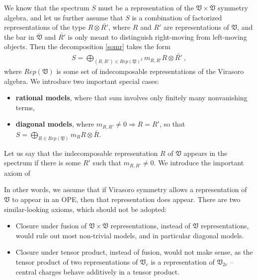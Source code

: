\documentclass[12pt, a4paper, notitlepage, twoside]{report}
\numberwithin{equation}{section}
\theoremstyle{break}
\begin{document}
We know that the spectrum $S$ must be a representation of the 
$\mathfrak{V}\times \overline{\mathfrak{V}}$ symmetry algebra, and let us further assume that $S$ is a combination of factorized representations of the type $R\otimes \bar{R'}$, where $R$ and $R'$ are representations of $\mathfrak{V}$, and the bar in $\overline{\mathfrak{V}}$ and $\bar{R'}$ is only meant to distinguish right-moving from left-moving objects. Then the decomposition \eqref{somr} takes the form
\begin{align}
 \boxed{S = \bigoplus_{(R,R')\in Rep(\mathfrak{V})^2} m_{R,R'} R\otimes \bar{R'}}\ ,
\label{sorr}
\end{align}
where $Rep(\mathfrak{V})$ is some set of indecomposable representations of the Virasoro algebra.
We introduce two important special cases:
\begin{itemize}
\item \textbf{\boldmath rational models}, where that sum involves only finitely many nonvanishing terms,
 \item \textbf{\boldmath diagonal models}, where $m_{R,R'}\neq 0 \Rightarrow R=R'$, so that $S=\bigoplus_{R\in Rep(\mathfrak{V})} m_R R\otimes \bar{R}$.
\end{itemize}
Let us say that the indecomposable representation $R$ of $\mathfrak{V}$ appears in the spectrum if there is some $R'$ such that $m_{R,R'} \neq 0$.
We introduce the important axiom of 
\begin{center}
\end{center}
In other words, we assume that if Virasoro symmetry allows a representation of $\mathfrak{V}$ to appear in an OPE, then that representation does appear.
There are two similar-looking axioms, which should not be adopted:
\begin{itemize}
 \item Closure under fusion of $\mathfrak{V}\times \overline{\mathfrak{V}}$ representations, instead of $\mathfrak{V}$ representations, would rule out most non-trivial models, and in particular diagonal models. 
\item Closure under tensor product, instead of fusion, would not make sense, as the tensor product of two representations of $\mathfrak{V}_c$ is a representation of $\mathfrak{V}_{2c}$ -- central charges behave additively in a tensor product. 
\end{itemize}
\end{document}
